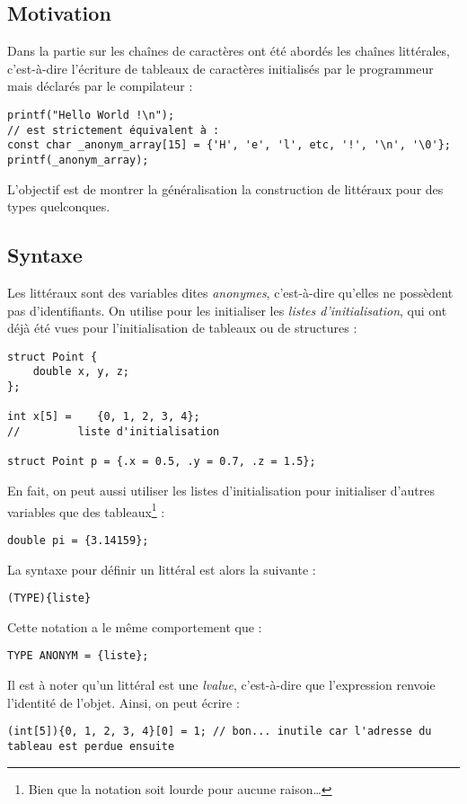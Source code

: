 \documentclass[../../../main.tex]{subfiles}
\begin{document}
\subsection{Motivation}
\label{sub:motivation}
Dans la partie sur les chaînes de caractères ont été abordés les chaînes littérales, c'est-à-dire l'écriture de tableaux de caractères initialisés par le programmeur mais déclarés par le compilateur :
\begin{verbatim}
printf("Hello World !\n");
// est strictement équivalent à :
const char _anonym_array[15] = {'H', 'e', 'l', etc, '!', '\n', '\0'};
printf(_anonym_array);
\end{verbatim}
L'objectif est de montrer la généralisation la construction de littéraux pour des types quelconques. 
\subsection{Syntaxe}
\label{sub:syntaxe_litteraux}
Les littéraux sont des variables dites \textit{anonymes}, c'est-à-dire qu'elles ne possèdent pas d'identifiants. On utilise pour les initialiser les \textit{listes d'initialisation}, qui ont déjà été vues pour l'initialisation de tableaux ou de structures :
\begin{verbatim}
struct Point {
	double x, y, z;	
};

int x[5] =    {0, 1, 2, 3, 4};
//         liste d'initialisation

struct Point p = {.x = 0.5, .y = 0.7, .z = 1.5};
\end{verbatim}
En fait, on peut aussi utiliser les listes d'initialisation pour initialiser d'autres variables que des tableaux\footnote{Bien que la notation soit lourde pour aucune raison\dots} :
\begin{verbatim}
double pi = {3.14159};
\end{verbatim}
La syntaxe pour définir un littéral est alors la suivante :
\begin{verbatim}
(TYPE){liste}
\end{verbatim}
Cette notation a le même comportement que :
\begin{verbatim}
TYPE ANONYM = {liste};
\end{verbatim}
Il est à noter qu'un littéral est une \textit{lvalue}, c'est-à-dire que l'expression renvoie l'identité de l'objet. Ainsi, on peut écrire :
\begin{verbatim}
(int[5]){0, 1, 2, 3, 4}[0] = 1; // bon... inutile car l'adresse du tableau est perdue ensuite
\end{verbatim}
\end{document}
